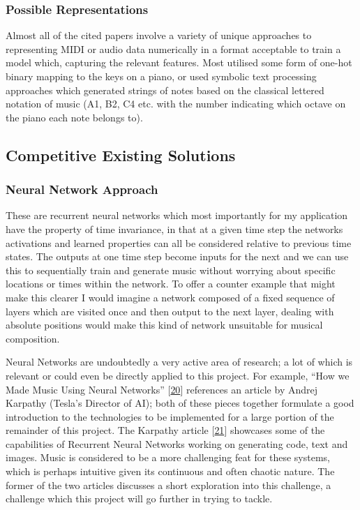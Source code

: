 \documentclass[12pt,]{article}
\begin{document}
\hypertarget{possible-representations}{%
\subsubsection{Possible
Representations}\label{possible-representations}}

Almost all of the cited papers involve a variety of unique approaches to
representing MIDI or audio data numerically in a format acceptable to
train a model which, capturing the relevant features. Most utilised some
form of one-hot binary mapping to the keys on a piano, or used symbolic
text processing approaches which generated strings of notes based on the
classical lettered notation of music (A1, B2, C4 etc. with the number
indicating which octave on the piano each note belongs to).

\hypertarget{competitive-existing-solutions}{%
\subsection{Competitive Existing
Solutions}\label{competitive-existing-solutions}}

\hypertarget{neural-network-approach}{%
\subsubsection{Neural Network Approach}\label{neural-network-approach}}

These are recurrent neural networks which most importantly for my
application have the property of time invariance, in that at a given
time step the networks activations and learned properties can all be
considered relative to previous time states. The outputs at one time
step become inputs for the next and we can use this to sequentially
train and generate music without worrying about specific locations or
times within the network. To offer a counter example that might make
this clearer I would imagine a network composed of a fixed sequence of
layers which are visited once and then output to the next layer, dealing
with absolute positions would make this kind of network unsuitable for
musical composition.

Neural Networks are undoubtedly a very active area of research; a lot of
which is relevant or could even be directly applied to this project. For
example, ``How we Made Music Using Neural Networks''
{[}\protect\hyperlink{ref-alextavgen}{20}{]} references an article by
Andrej Karpathy (Tesla's Director of AI); both of these pieces together
formulate a good introduction to the technologies to be implemented for
a large portion of the remainder of this project. The Karpathy article
{[}\protect\hyperlink{ref-karpathy}{21}{]} showcases some of the
capabilities of Recurrent Neural Networks working on generating code,
text and images. Music is considered to be a more challenging feat for
these systems, which is perhaps intuitive given its continuous and often
chaotic nature. The former of the two articles discusses a short
exploration into this challenge, a challenge which this project will go
further in trying to tackle.
\end{document}
